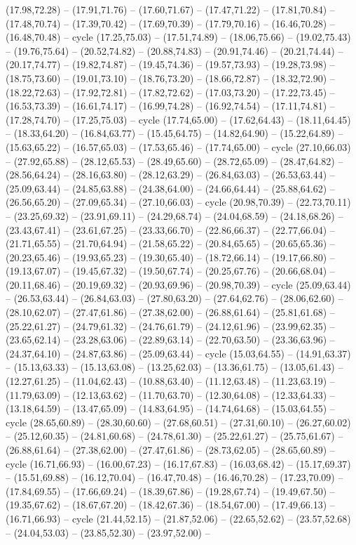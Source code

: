 {(17.98,72.28) -- (17.91,71.76) -- (17.60,71.67) -- (17.47,71.22) -- (17.81,70.84) -- (17.48,70.74) -- (17.39,70.42) -- (17.69,70.39) -- (17.79,70.16) -- (16.46,70.28) -- (16.48,70.48) -- cycle (17.25,75.03) -- (17.51,74.89) -- (18.06,75.66) -- (19.02,75.43) -- (19.76,75.64) -- (20.52,74.82) -- (20.88,74.83) -- (20.91,74.46) -- (20.21,74.44) -- (20.17,74.77) -- (19.82,74.87) -- (19.45,74.36) -- (19.57,73.93) -- (19.28,73.98) -- (18.75,73.60) -- (19.01,73.10) -- (18.76,73.20) -- (18.66,72.87) -- (18.32,72.90) -- (18.22,72.63) -- (17.92,72.81) -- (17.82,72.62) -- (17.03,73.20) -- (17.22,73.45) -- (16.53,73.39) -- (16.61,74.17) -- (16.99,74.28) -- (16.92,74.54) -- (17.11,74.81) -- (17.28,74.70) -- (17.25,75.03) -- cycle (17.74,65.00) -- (17.62,64.43) -- (18.11,64.45) -- (18.33,64.20) -- (16.84,63.77) -- (15.45,64.75) -- (14.82,64.90) -- (15.22,64.89) -- (15.63,65.22) -- (16.57,65.03) -- (17.53,65.46) -- (17.74,65.00) -- cycle (27.10,66.03) -- (27.92,65.88) -- (28.12,65.53) -- (28.49,65.60) -- (28.72,65.09) -- (28.47,64.82) -- (28.56,64.24) -- (28.16,63.80) -- (28.12,63.29) -- (26.84,63.03) -- (26.53,63.44) -- (25.09,63.44) -- (24.85,63.88) -- (24.38,64.00) -- (24.66,64.44) -- (25.88,64.62) -- (26.56,65.20) -- (27.09,65.34) -- (27.10,66.03) -- cycle (20.98,70.39) -- (22.73,70.11) -- (23.25,69.32) -- (23.91,69.11) -- (24.29,68.74) -- (24.04,68.59) -- (24.18,68.26) -- (23.43,67.41) -- (23.61,67.25) -- (23.33,66.70) -- (22.86,66.37) -- (22.77,66.04) -- (21.71,65.55) -- (21.70,64.94) -- (21.58,65.22) -- (20.84,65.65) -- (20.65,65.36) -- (20.23,65.46) -- (19.93,65.23) -- (19.30,65.40) -- (18.72,66.14) -- (19.17,66.80) -- (19.13,67.07) -- (19.45,67.32) -- (19.50,67.74) -- (20.25,67.76) -- (20.66,68.04) -- (20.11,68.46) -- (20.19,69.32) -- (20.93,69.96) -- (20.98,70.39) -- cycle (25.09,63.44) -- (26.53,63.44) -- (26.84,63.03) -- (27.80,63.20) -- (27.64,62.76) -- (28.06,62.60) -- (28.10,62.07) -- (27.47,61.86) -- (27.38,62.00) -- (26.88,61.64) -- (25.81,61.68) -- (25.22,61.27) -- (24.79,61.32) -- (24.76,61.79) -- (24.12,61.96) -- (23.99,62.35) -- (23.65,62.14) -- (23.28,63.06) -- (22.89,63.14) -- (22.70,63.50) -- (23.36,63.96) -- (24.37,64.10) -- (24.87,63.86) -- (25.09,63.44) -- cycle (15.03,64.55) -- (14.91,63.37) -- (15.13,63.33) -- (15.13,63.08) -- (13.25,62.03) -- (13.36,61.75) -- (13.05,61.43) -- (12.27,61.25) -- (11.04,62.43) -- (10.88,63.40) -- (11.12,63.48) -- (11.23,63.19) -- (11.79,63.09) -- (12.13,63.62) -- (11.70,63.70) -- (12.30,64.08) -- (12.33,64.33) -- (13.18,64.59) -- (13.47,65.09) -- (14.83,64.95) -- (14.74,64.68) -- (15.03,64.55) -- cycle (28.65,60.89) -- (28.30,60.60) -- (27.68,60.51) -- (27.31,60.10) -- (26.27,60.02) -- (25.12,60.35) -- (24.81,60.68) -- (24.78,61.30) -- (25.22,61.27) -- (25.75,61.67) -- (26.88,61.64) -- (27.38,62.00) -- (27.47,61.86) -- (28.73,62.05) -- (28.65,60.89) -- cycle (16.71,66.93) -- (16.00,67.23) -- (16.17,67.83) -- (16.03,68.42) -- (15.17,69.37) -- (15.51,69.88) -- (16.12,70.04) -- (16.47,70.48) -- (16.46,70.28) -- (17.23,70.09) -- (17.84,69.55) -- (17.66,69.24) -- (18.39,67.86) -- (19.28,67.74) -- (19.49,67.50) -- (19.35,67.62) -- (18.67,67.20) -- (18.42,67.36) -- (18.54,67.00) -- (17.49,66.13) -- (16.71,66.93) -- cycle (21.44,52.15) -- (21.87,52.06) -- (22.65,52.62) -- (23.57,52.68) -- (24.04,53.03) -- (23.85,52.30) -- (23.97,52.00) -- }
